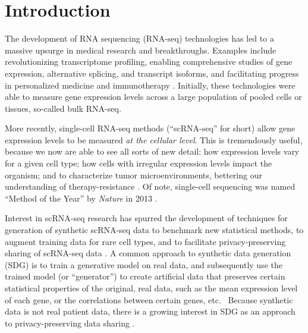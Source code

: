 \documentclass[unnumsec,webpdf,contemporary,large]{oup-authoring-template}%
\theoremstyle{thmstyleone}%
\theoremstyle{thmstyletwo}%
\theoremstyle{thmstylethree}%
\begin{document}
\maketitle


\section{Introduction}

The development of RNA sequencing (RNA-seq) technologies has led to a massive upsurge in medical research and breakthroughs. Examples include revolutionizing transcriptome profiling, enabling comprehensive studies of gene expression, alternative splicing, and transcript isoforms, 
and facilitating progress in personalized medicine and immunotherapy \cite{isaic_next-generation_2025,lang_editorial_2023}. Initially, these technologies were able to measure 
gene expression levels across a large population of pooled cells or tissues, so-called bulk RNA-seq.

More recently, single-cell RNA-seq methods (``scRNA-seq'' for short) allow gene expression levels to be measured \textit{at the cellular level}. This is tremendously useful, because we now are able to see all sorts of new detail: how expression levels vary for a given cell type; how cells with irregular expression levels impact the organism; and to characterize tumor microenvironments, bettering our understanding of therapy-resistance \cite{chang_single-cell_2024}.
Of note, single-cell sequencing was named ``Method of the Year'' by \textit{Nature} in 2013 \cite{noauthor_method_2014}.

Interest in scRNA-seq research has spurred the development of techniques for generation of synthetic scRNA-seq data to benchmark new statistical methods, to augment training data for rare cell types, and to facilitate privacy-preserving sharing of scRNA-seq data \cite{luo2024scdiffusion,marouf_realistic_2020,sun2021scdesign2}. A common approach to synthetic data generation (SDG) is to train a generative model on real data, and subsequently use the trained model (or ``generator'') to create artificial data that preserves certain statistical properties of the original, real data, such as the mean expression level of each gene, or the correlations between certain genes, etc.~\cite{gronbech2020scvae,zhang2025cfdiffusion}
Because synthetic data is not real patient data, there is a growing interest in SDG as an approach to privacy-preserving data sharing \cite{hu2023sok}.
\end{document}

